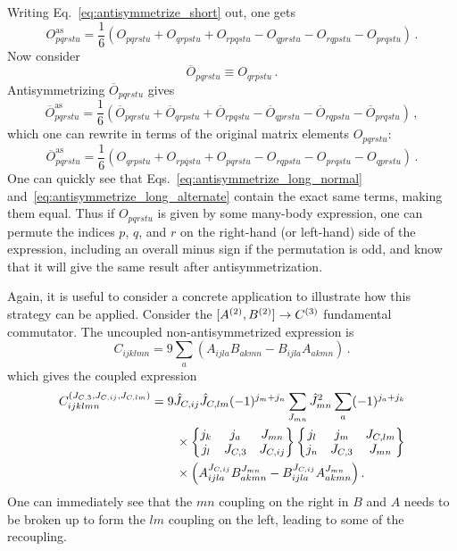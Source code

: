 Writing Eq.~\eqref{eq:antisymmetrize_short} out, one gets
\begin{equation}\label{eq:antisymmetrize_long_normal}
    O^{\text{as}}_{pqrstu} = \frac{1}{6} (O_{pqrstu} + O_{qrpstu} + O_{rpqstu} - O_{qprstu} - O_{rqpstu} - O_{prqstu})\,.
\end{equation}
Now consider
\begin{equation}
    \overline{O}_{pqrstu} \equiv O_{qrpstu}\,.
\end{equation}
Antisymmetrizing $\overline{O}_{pqrstu}$ gives
\begin{equation}
    \overline{O}^{\text{as}}_{pqrstu} = \frac{1}{6} (\overline{O}_{pqrstu} + \overline{O}_{qrpstu} + \overline{O}_{rpqstu}
    - \overline{O}_{qprstu} - \overline{O}_{rqpstu} - \overline{O}_{prqstu})\,,
\end{equation}
which one can rewrite in terms of the original matrix elements $O_{pqrstu}$:
\begin{equation}\label{eq:antisymmetrize_long_alternate}
    \overline{O}^{\text{as}}_{pqrstu} = \frac{1}{6} (O_{qrpstu} + O_{rpqstu} + O_{pqrstu}
    - O_{rqpstu} - O_{prqstu} - O_{qprstu})\,.
\end{equation}
One can quickly see that Eqs.~\eqref{eq:antisymmetrize_long_normal} and~\eqref{eq:antisymmetrize_long_alternate}
contain the exact same terms, making them equal.
Thus if $O_{pqrstu}$ is given by some many-body expression,
one can permute the indices $p$, $q$, and $r$ on the right-hand (or left-hand) side of the expression,
including an overall minus sign if the permutation is odd,
and know that it will give the same result after antisymmetrization.

Again, it is useful to consider a concrete application to illustrate how this strategy can be applied.
Consider the $[{A}^{(2)}, {B}^{(2)}] \rightarrow {C}^{(3)}$ fundamental commutator.
The uncoupled non-antisymmetrized expression is
\begin{equation}
    C_{ijklmn} = 9 \sum_{a} (A_{ijla} B_{akmn} - B_{ijla} A_{akmn})\,.
\end{equation}
which gives the coupled expression
\begin{equation}\label{eq:comm_223_bad}
    \begin{split}
        C_{ijklmn}^{(J_{C,3}, J_{C,ij}, J_{C,lm})} & =
        9 \hat{J}_{C,ij} \hat{J}_{C,lm}
        (-1)^{j_m + j_n}
        \sum_{J_{mn}}
        \hat{J}_{mn}^2
        \sum_{a} (-1)^{j_a + j_k} \\
        & \quad \quad \times
        \sixj{j_k}{j_a}{J_{mn}}{j_{l}}{J_{C,3}}{J_{C,ij}}
        \sixj{j_l}{j_m}{J_{C,lm}}{j_{n}}{J_{C,3}}{J_{mn}} \\
        & \quad \quad \times \left(
        A_{ijla}^{J_{C,ij}} B_{akmn}^{J_{mn}}
        - B_{ijla}^{J_{C,ij}} A_{akmn}^{J_{mn}}
        \right).
    \end{split}
\end{equation}
One can immediately see that
the $mn$ coupling on the right in $B$ and $A$ needs to be broken up
to form the $lm$ coupling on the left,
leading to some of the recoupling.

